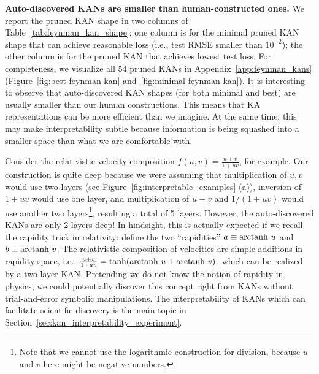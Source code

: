 \documentclass{article}
\numberwithin{equation}{section}
\numberwithin{figure}{section}
\begin{document}
{\bf Auto-discovered KANs are smaller than human-constructed ones.} We report the pruned KAN shape in two columns of Table~\ref{tab:feynman_kan_shape}; one column is for the minimal pruned KAN shape that can achieve reasonable loss (i.e., test RMSE smaller than $10^{-2}$); the other column is for the pruned KAN that achieves lowest test loss. For completeness, we visualize all 54 pruned KANs in Appendix~\ref{app:feynman_kans} (Figure~\ref{fig:best-feynman-kan} and~\ref{fig:minimal-feynman-kan}). It is interesting to observe that auto-discovered KAN shapes (for both minimal and best) are usually smaller than our human constructions. This means that KA representations can be more efficient than we imagine. At the same time, this may make interpretability subtle because information is being squashed into a smaller space than what we are comfortable with. 

Consider %
the relativistic velocity composition $f(u,v)=\frac{u+v}{1+uv}$, for example. Our construction is quite deep because we were assuming that multiplication of $u,v$ would use two layers (see Figure~\ref{fig:interpretable_examples} (a)), inversion of $1+uv$ would use one layer, and multiplication of $u+v$ and $1/(1+uv)$ would use another two layers\footnote{Note that we cannot use the logarithmic construction for division, because $u$ and $v$ here might be negative numbers.}, resulting a total of 5 layers. However, the auto-discovered KANs are only 2 layers deep! In hindsight, this is actually expected if we recall the rapidity trick in relativity: define the two ``rapidities'' $a\equiv {\rm arctanh}\ u$ and $b\equiv {\rm arctanh}\ v$. The relativistic composition of velocities are simple additions in rapidity space, i.e., $\frac{u+v}{1+uv}={\rm tanh}({\rm arctanh}\ u + {\rm arctanh}\ v)$, which can be realized by a two-layer KAN. Pretending we do not know the notion of rapidity in physics, we could potentially discover this concept right from KANs without trial-and-error symbolic manipulations. The interpretability of KANs which can facilitate scientific discovery is the main topic in Section~\ref{sec:kan_interpretability_experiment}.

\end{document}
